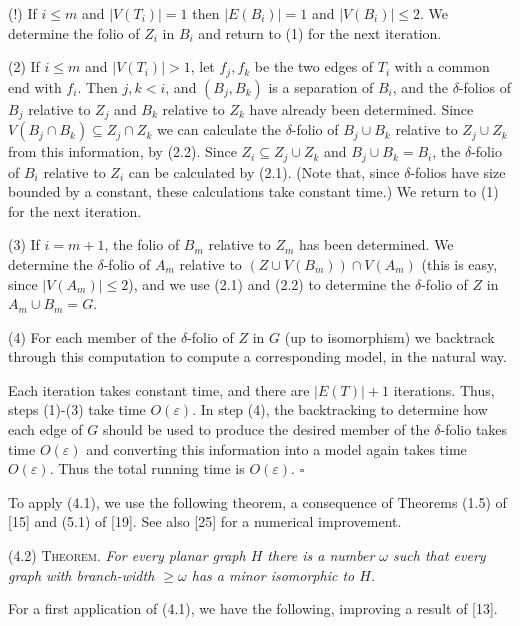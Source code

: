 \noindent (!) If $i \le m$ and $|V(T_i)| = 1$ then $|E(B_i)| = 1$ and $|V(B_i)| \le 2$. We determine the folio of $Z_i$ in $B_i$ and return to (1) for the next iteration.

\hspace*{12pt}(2) If $i \le m$ and $|V(T_i)| > 1$, let $f_j, f_k$ be the two edges of $T_i$ with a common end with $f_i$. Then $j, k < i$, and $(B_j, B_k)$ is a separation of $B_i$, and the $\delta$-folios of $B_j$ relative to $Z_j$ and $B_k$ relative to $Z_k$ have already been determined. Since $V(B_j \cap B_k) \subseteq Z_j \cap Z_k$ we can calculate the $\delta$-folio of $B_j \cup B_k$ relative to $Z_j \cup Z_k$ from this information, by (2.2). Since $Z_i \subseteq Z_j \cup Z_k$ and $B_j \cup B_k = B_i$, the $\delta$-folio of $B_i$ relative to $Z_i$ can be calculated by (2.1). (Note that, since $\delta$-folios have size bounded by a constant, these calculations take constant time.) We return to (1) for the next iteration.

\hspace*{12pt}(3) If $i = m + 1$, the folio of $B_m$ relative to $Z_m$ has been determined. We determine the $\delta$-folio of $A_m$ relative to $(Z \cup V(B_m)) \cap V(A_m)$ (this is easy, since $|V(A_m)| \le 2$), and we use (2.1) and (2.2) to determine the $\delta$-folio of $Z$ in $A_m \cup B_m = G$.

\hspace*{12pt}(4) For each member of the $\delta$-folio of $Z$ in $G$ (up to isomorphism) we backtrack through this computation to compute a corresponding model, in the natural way.

Each iteration takes constant time, and there are $|E(T)| + 1$ iterations. Thus, steps (1)-(3) take time $O(\varepsilon)$. In step (4), the backtracking to determine how each edge of $G$ should be used to produce the desired member of the $\delta$-folio takes time $O(\varepsilon)$ and converting this information into a model again takes time $O(\varepsilon)$. Thus the total running time is $O(\varepsilon)$. $\square$

To apply (4.1), we use the following theorem, a consequence of Theorems (1.5) of [15] and (5.1) of [19]. See also [25] for a numerical improvement.

\stmt
(4.2) \textsc{Theorem}. \textit{For every planar graph $H$ there is a number $\omega$ such that every graph with branch-width $\ge \omega$ has a minor isomorphic to $H$.}

For a first application of (4.1), we have the following, improving a result of [13].

